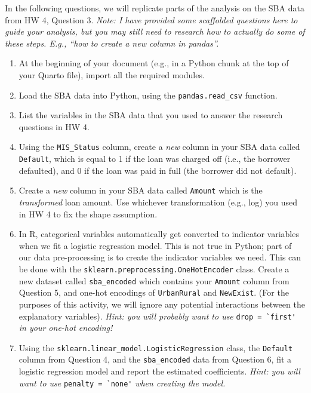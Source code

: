 \documentclass[11pt]{article}
\begin{document}
In the following questions, we will replicate parts of the analysis on the SBA data from HW 4, Question 3. \textit{Note: I have provided some scaffolded questions here to guide your analysis, but you may still need to research \emph{how} to actually do some of these steps. E.g., \emph{``how to create a new column in pandas''}.}

\begin{enumerate}

\item At the beginning of your document (e.g., in a Python chunk at the top of your Quarto file), import all the required modules.

\item Load the SBA data into Python, using the \verb;pandas.read_csv; function.

\item List the variables in the SBA data that you used to answer the research questions in HW 4.

\item Using the \verb;MIS_Status; column, create a \textit{new} column in your SBA data called \verb;Default;, which is equal to 1 if the loan was charged off (i.e., the borrower defaulted), and 0 if the loan was paid in full (the borrower did not default).

\item Create a \textit{new} column in your SBA data called \verb;Amount; which is the \textit{transformed} loan amount. Use whichever transformation (e.g., log) you used in HW 4 to fix the shape assumption.

\item In R, categorical variables automatically get converted to indicator variables when we fit a logistic regression model. This is not true in Python; part of our data pre-processing is to create the indicator variables we need. This can be done with the \texttt{sklearn.preprocessing.OneHotEncoder} class. Create a new dataset called \verb;sba_encoded; which contains your \verb;Amount; column from Question 5, and one-hot encodings of \texttt{UrbanRural} and \texttt{NewExist}. (For the purposes of this activity, we will ignore any potential interactions between the explanatory variables). \textit{Hint: you will probably want to use} \verb;drop = `first'; \textit{in your one-hot encoding!}

\item Using the \verb;sklearn.linear_model.LogisticRegression; class, the \verb;Default; column from Question 4, and the \verb;sba_encoded; data from Question 6, fit a logistic regression model and report the estimated coefficients. \textit{Hint: you will want to use} \verb;penalty = `none'; \textit{when creating the model.}


\end{enumerate}
\end{document}
